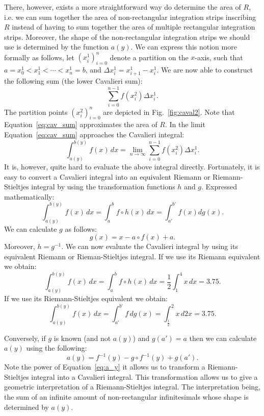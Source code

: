 \documentclass{article}
\theoremstyle{theorem}
\theoremstyle{definition}
\begin{document}
There, however, exists a more straightforward way do determine the area of $R$, i.e. we can sum together the area of non-rectangular integration strips inscribing $R$ instead of
having to sum together the area of multiple rectangular integration strips. Moreover, the shape of the non-rectangular integration strips we should use is determined by the function $a(y)$. We can express this notion more formally as 
follows, let $(x_i^1)_{i=0}^{n}$ denote a partition on the $x$-axis, such that $a = x_0^1 < x_1^1 < \cdots < x_n^1 = b$, and $\Delta x_i^1 = x_{i+1}^1 - x_i^1$.
We are now able to construct the following sum (the lower Cavalieri sum):
\begin{equation}
\label{eq:cav_sum}
\sum_{i=0}^{n-1} f(x_i^2)\Delta x_i^1.
\end{equation}
The partition points $(x_i^2)_{i=0}^{n}$ are depicted in Fig.~\ref{fig:caval2}. Note that Equation~\ref{eq:cav_sum} approximates the area of $R$. In the limit Equation~\ref{eq:cav_sum} approaches 
the Cavalieri integral:
\begin{equation}
\label{eq:caval1}
\int_{a(y)}^{b(y)}f(x)\, dx = \lim_{n\to \infty}\sum_{i=0}^{n-1} f(x_i^2)\Delta x_i^1.
\end{equation}
It is, however, quite hard to evaluate the above integral directly. Fortunately, it is easy to convert a Cavalieri integral into an equivalent Riemann or Riemann-Stieltjes 
integral by using the transformation functions $h$ and $g$. Expressed mathematically:
\begin{equation}
\int_{a(y)}^{b(y)}f(x)\,dx =\int_a^b f \circ h (x)\, dx = \int_{a'}^{b'} f(x) dg(x).
\end{equation}
We can calculate $g$ as follows:
\begin{equation}
g(x) = x - a\circ f(x) + a.
\end{equation}
Moreover, $h=g^{-1}$. We can now evaluate the Cavalieri integral by using its equivalent Riemann or Rieman-Stieltjes integral.
If we use its Riemann equivalent we obtain:
\begin{equation}
\int_{a(y)}^{b(y)}f(x)\, dx = \int_a^b f \circ h (x)\, dx = \dfrac{1}{2}\int_1^4x\, dx = 3.75.  
\end{equation}
If we use its Riemann-Stieltjes equivalent we obtain:
\begin{equation}
\int_{a(y)}^{b(y)}f(x)\, dx = \int_{a'}^{b'} f \, dg(x) = \int_{\frac{1}{2}}^2x\, d2x = 3.75.  
\end{equation}

Conversely, if $g$ is known (and not $a(y)$) and $g(a') = a$ then we can calculate $a(y)$ using the following:
\begin{equation}
\label{eq:a_y}
a(y) = f^{-1}(y) - g\circ f^{-1}(y) + g(a'). 
\end{equation}
Note the power of Equation~\ref{eq:a_y} it allows us to transform a Riemann-Stieltjes integral into a Cavalieri integral. 
This transformation allows us to give a geometric interpretation of a Riemann-Stieltjes integral. The interpretation being,
the sum of an infinite amount of non-rectangular infinitesimals whose shape is determined by $a(y)$.
\end{document}

